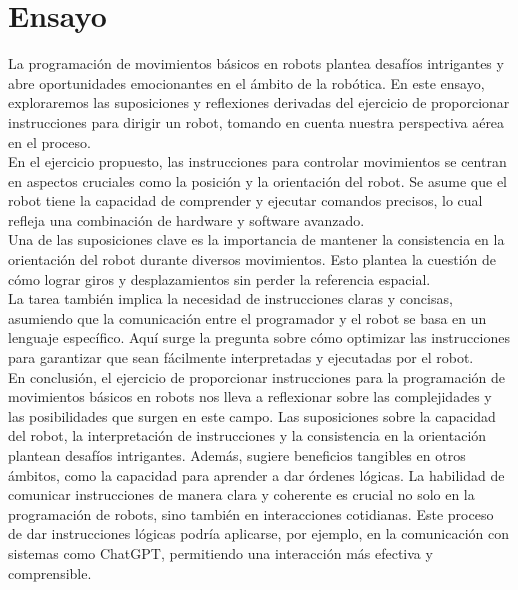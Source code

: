 \documentclass[hf]{ceurart}
\begin{document}
\section{Ensayo}
La programación de movimientos básicos en robots plantea desafíos intrigantes y abre oportunidades emocionantes en el ámbito de la robótica. En este ensayo, exploraremos las suposiciones y reflexiones derivadas del ejercicio de proporcionar instrucciones para dirigir un robot, tomando en cuenta nuestra perspectiva aérea en el proceso.\\
En el ejercicio propuesto, las instrucciones para controlar movimientos se centran en aspectos cruciales como la posición y la orientación del robot. Se asume que el robot tiene la capacidad de comprender y ejecutar comandos precisos, lo cual refleja una combinación de hardware y software avanzado.\\
Una de las suposiciones clave es la importancia de mantener la consistencia en la orientación del robot durante diversos movimientos. Esto plantea la cuestión de cómo lograr giros y desplazamientos sin perder la referencia espacial.\\
La tarea también implica la necesidad de instrucciones claras y concisas, asumiendo que la comunicación entre el programador y el robot se basa en un lenguaje específico. Aquí surge la pregunta sobre cómo optimizar las instrucciones para garantizar que sean fácilmente interpretadas y ejecutadas por el robot.\\
En conclusión, el ejercicio de proporcionar instrucciones para la programación de movimientos básicos en robots nos lleva a reflexionar sobre las complejidades y las posibilidades que surgen en este campo. Las suposiciones sobre la capacidad del robot, la interpretación de instrucciones y la consistencia en la orientación plantean desafíos intrigantes. Además, sugiere beneficios tangibles en otros ámbitos, como la capacidad para aprender a dar órdenes lógicas. La habilidad de comunicar instrucciones de manera clara y coherente es crucial no solo en la programación de robots, sino también en interacciones cotidianas. Este proceso de dar instrucciones lógicas podría aplicarse, por ejemplo, en la comunicación con sistemas como ChatGPT, permitiendo una interacción más efectiva y comprensible.
\end{document}
